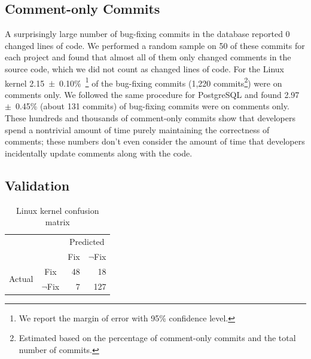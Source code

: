 \subsection{Comment-only Commits}
\label{sec-comment-only}

A surprisingly large number of bug-fixing commits in the database reported 0
changed lines of code. We performed a random sample on 50 of these commits for
each project and found that almost all of them only changed comments in the
source code, which we did not count as changed lines of code. For the Linux
kernel 2.15~$\pm$~0.10\%~\footnote{We report the margin of error with 95\%
  confidence level.}  of the bug-fixing commits (1,220
commits\footnote{Estimated based on the percentage of comment-only commits and
  the total number of commits.}) were on comments only. We followed the same
procedure for PostgreSQL and found 2.97~$\pm$~0.45\% (about 131 commits) of
bug-fixing commits were on comments only.  These hundreds and thousands of
comment-only commits show that developers spend a nontrivial amount of time
purely maintaining the correctness of comments; these numbers don't even
consider the amount of time that developers incidentally update comments along
with the code.


\subsection{Validation} 
\label{sec-validation}

\begin{table}
\begin{center}
\begin{tabular}{rrrr}
& & \multicolumn{2}{c}{Predicted} \\
& & \multicolumn{1}{|c}{Fix} & \multicolumn{1}{c}{$\neg$Fix} \\ \cline{2-4}
\multirow{2}{*}{Actual} & \multicolumn{1}{c|}{Fix} &  48 & 18 \\
                        &  \multicolumn{1}{c|}{$\neg$Fix} & 7 & 127 \\
\end{tabular}
\end{center}
\caption{\label{tbl-linux-confusion}Linux kernel confusion matrix}
\end{table}

